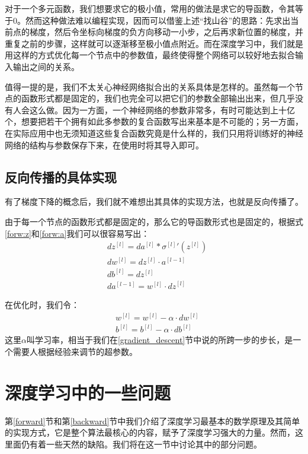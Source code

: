 \documentclass[UTF8,a4paper]{ctexart}
\begin{document}
\begin{multicols}{2}
			\indent 对于一个多元函数，我们想要求它的极小值，常用的做法是求它的导函数，令其等于0。然而这种做法难以编程实现，因而可以借鉴上述“找山谷”的思路：先求出当前点的梯度，然后令坐标向梯度的负方向移动一小步，之后再求新位置的梯度，并重复之前的步骤，这样就可以逐渐移至极小值点附近。而在深度学习中，我们就是用这样的方式优化每一个节点中的参数值，最终使得整个网络可以较好地去拟合输入输出之间的关系。
			
			\indent 值得一提的是，我们不太关心神经网络拟合出的关系具体是怎样的。虽然每一个节点的函数形式都是固定的，我们也完全可以把它们的参数全部输出出来，但几乎没有人会这么做。因为一方面，一个神经网络的参数非常多，有时可能达到上十亿个，想要把若干个拥有如此多参数的复合函数写出来基本是不可能的；另一方面，在实际应用中也无须知道这些复合函数究竟是什么样的，我们只用将训练好的神经网络的结构与参数保存下来，在使用时将其导入即可。
			
		\subsection{反向传播的具体实现}
			\indent 有了梯度下降的概念后，我们就不难想出其具体的实现方法，也就是反向传播了。
			
			\indent 由于每一个节点的函数形式都是固定的，那么它的导函数形式也是固定的，根据式\ref{forw:z}和\ref{forw:a}我们可以很容易写出：
			\begin{align}
			&d{{z}^{[l]}}=d{{a}^{[l]}}*{{\sigma}^{[l]}}'( {{z}^{[l]}})  \\
			&d{{w}^{[l]}}=d{{z}^{[l]}}\cdot{{a}^{[l-1]}} \\
			&d{{b}^{[l]}}=d{{z}^{[l]}} \\
			&d{{a}^{[l-1]}}={{w}^{\left[ l \right]}}\cdot {{dz}^{[l]}} 
		    \end{align}
			
			\indent 在优化时，我们令：
			\begin{align}
			&w^{[l]}=w^{[l]}-\alpha \cdot d{{w}^{[l]}} \\
			&b^{[l]}=b^{[l]}-\alpha \cdot d{{b}^{[l]}}
			\end{align}
			这里$\alpha$叫学习率，相当于我们在\ref{gradient_descent}节中说的所跨一步的步长，是一个需要人根据经验来调节的超参数。
			
			
		\section{深度学习中的一些问题}
		\indent 第\ref{forward}节和第\ref{backward}节中我们介绍了深度学习最基本的数学原理及其简单的实现方式，它是整个算法最核心的内容，赋予了深度学习强大的力量。然而，这里面仍有着一些天然的缺陷。我们将在这一节中讨论其中的部分问题。

\end{multicols}
\end{document}
